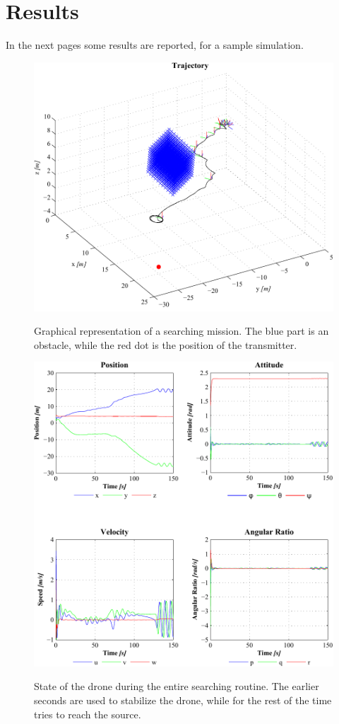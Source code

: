 \saltino
\FloatBarrier

\section{Results}
In the next pages some results are reported, for a sample simulation.

\begin{figure}[f]
	\centering
	\includegraphics[]{ch4/img/3Dplot.pdf}
\label{fig:3dplot}
\caption{Graphical representation of a searching mission. The blue part is an obstacle, while the red dot is the position of the transmitter.}
\end{figure}

\begin{figure}[f]
	\centering
	\includegraphics[]{ch4/img/State.pdf}
\label{fig:state}
\caption{State of the drone during the entire searching routine. The earlier seconds are used to stabilize the drone, while for the rest of the time tries to reach the source.}
\end{figure}

